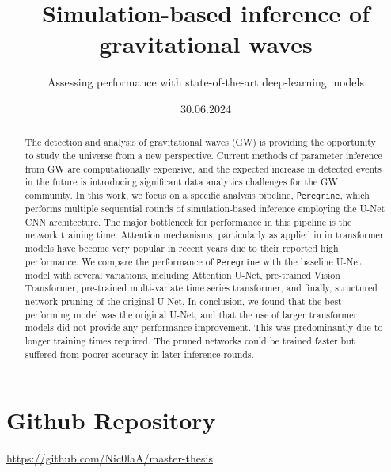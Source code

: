 \documentclass[ds,nofirstcompanypicture,nolinenumbering]{mscthesis}
\title{Simulation-based inference of gravitational waves}
\subtitle{Assessing performance with state-of-the-art deep-learning models}
\date{30.06.2024}
\begin{document}
\pagestyle{plain}

\maketitlepage
\fixemptypage
\setcounter{page}{1}

\begin{abstract}

The detection and analysis of gravitational waves (GW) is providing the opportunity to study the universe from a new perspective. Current methods of parameter inference from GW are computationally expensive, and the expected increase in detected events in the future is introducing significant data analytics challenges for the GW community. In this work, we focus on a specific analysis pipeline, \texttt{Peregrine}, which performs multiple sequential rounds of simulation-based inference employing the U-Net CNN architecture. The major bottleneck for performance in this pipeline is the network training time. Attention mechanisms, particularly as applied in in transformer models have become very popular in recent years due to their reported high performance. We compare the performance of \texttt{Peregrine} with the baseline U-Net model with several variations, including Attention U-Net, pre-trained Vision Transformer, pre-trained multi-variate time series transformer, and finally, structured network pruning of the original U-Net. In conclusion, we found that the best performing model was the original U-Net, and that the use of larger transformer models did not provide any performance improvement. This was predominantly due to longer training times required. The pruned networks could be trained faster but suffered from poorer accuracy in later inference rounds.

\end{abstract}

\maketitle

\section*{Github Repository}
\url{https://github.com/Nic0laA/master-thesis}



%








\newpage

\end{document}

